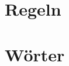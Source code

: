 \documentclass{report}
\begin{document}
\tableofcontents



\chapter{Regeln}




\chapter{W\"orter}








\end{document}
